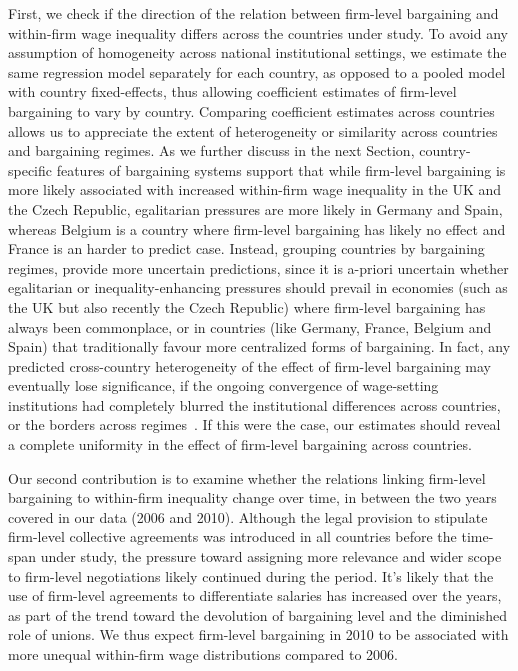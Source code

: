 \documentclass[Review,times,sageh,11pt]{sagej}
\begin{document}
First, we check if the direction of the relation between firm-level bargaining and within-firm wage inequality differs across the countries under study. To avoid any assumption of homogeneity across national institutional settings, we estimate the same regression model separately for each country, as opposed to a pooled model with country fixed-effects, thus allowing coefficient estimates of firm-level bargaining to vary by country. Comparing coefficient estimates across countries allows us to appreciate the extent of heterogeneity or similarity across countries and bargaining regimes. As we further discuss in the next Section, country-specific features of bargaining systems support that while firm-level bargaining is more likely associated with increased within-firm wage inequality in the UK and the Czech Republic, egalitarian pressures are more likely in Germany and Spain, whereas Belgium is a country where firm-level bargaining has likely no effect and France is an harder to predict case.
Instead, grouping countries by bargaining regimes, provide more uncertain predictions, since it is a-priori uncertain whether egalitarian or inequality-enhancing pressures should prevail in economies (such as the UK but also recently the Czech Republic) where firm-level bargaining has always been commonplace, or in countries (like Germany, France, Belgium and Spain) that traditionally favour more centralized forms of bargaining.
In fact, any predicted cross-country heterogeneity of the effect of firm-level bargaining may eventually lose significance, if the ongoing convergence of wage-setting institutions had completely blurred the institutional differences across countries, or the borders across regimes~\citep[see][]{baccaro2017trajectories}.
If this were the case, our estimates should reveal a complete uniformity in the effect of firm-level bargaining across countries. 

Our second contribution is to examine whether the relations linking firm-level bargaining to within-firm inequality change over time, in between the two years covered in our data (2006 and 2010). Although the legal provision to stipulate firm-level collective agreements was introduced in all countries before the time-span under study, the pressure toward assigning more relevance and wider scope to firm-level negotiations likely continued during the period. It's likely that the use of firm-level agreements to differentiate salaries has increased over the years, as part of the trend toward the devolution of bargaining level and the diminished role of unions. We thus expect firm-level bargaining in 2010 to be associated with more unequal within-firm wage distributions compared to 2006.
\end{document}

